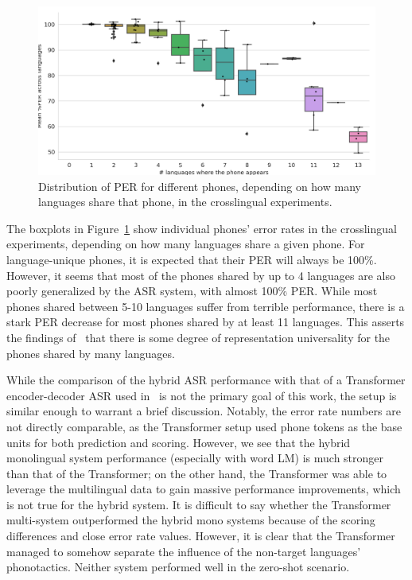\documentclass{article}
\begin{document}
\begin{figure}
    \centering
    \includegraphics[width=\linewidth]{Figure/per_language_per_crosslingual.png}
    \caption{Distribution of PER for different phones, depending on how many languages share that phone, in the crosslingual experiments.}
    \label{fig:crosslingual_per_lang_dist}
\end{figure}

The boxplots in Figure~\ref{fig:crosslingual_per_lang_dist} show individual phones' error rates in the crosslingual experiments, depending on how many languages share a given phone. For language-unique phones, it is expected that their PER will always be 100\%. However, it seems that most of the phones shared by up to 4 languages are also poorly generalized by the ASR system, with almost 100\% PER. While most phones shared between 5-10 languages suffer from terrible performance, there is a stark PER decrease for most phones shared by at least 11 languages. This asserts the findings of~\cite{Zelasko2020That} that there is some degree of representation universality for the phones shared by many languages.

While the comparison of the hybrid ASR performance with that of a Transformer encoder-decoder ASR used in~\cite{Zelasko2020That} is not the primary goal of this work, the setup is similar enough to warrant a brief discussion. Notably, the error rate numbers are not directly comparable, as the Transformer setup used phone tokens as the base units for both prediction and scoring. However, we see that the hybrid monolingual system performance (especially with word LM) is much stronger than that of the Transformer; on the other hand, the Transformer was able to leverage the multilingual data to gain massive performance improvements, which is not true for the hybrid system. It is difficult to say whether the Transformer multi-system outperformed the hybrid mono systems because of the scoring differences and close error rate values. However, it is clear that the Transformer managed to somehow separate the influence of the non-target languages' phonotactics. 
Neither system performed well in the zero-shot scenario.
\end{document}
